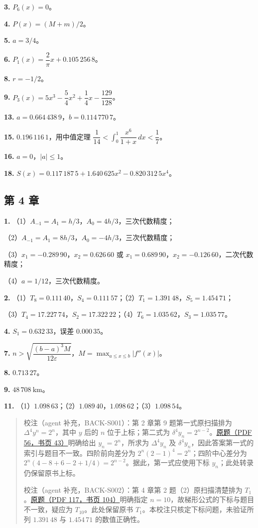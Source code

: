 \documentclass[
  10pt,
  fontset=fandol]{ctexart}
\begin{document}
\textbf{3.} \(P_6(x)=0\)。

\textbf{4.} \(P(x)=(M+m)/2\)。

\textbf{5.} \(a=3/4\)。

\textbf{6.} \(P_1(x)=\dfrac{2}{\pi}x+0.105\,256\,8\)。

\textbf{8.} \(r=-1/2\)。

\textbf{9.} \(P_3(x)=5x^3-\dfrac{5}{4}x^2+\dfrac{1}{4}x-\dfrac{129}{128}\)。

\textbf{13.} \(a=0.664\,438\,9\)，\(b=0.114\,770\,7\)。

\textbf{15.} \(0.196\,116\,1\)，用中值定理 \(\dfrac{1}{14}<\displaystyle\int_0^1\dfrac{x^6}{1+x}\,dx<\dfrac{1}{7}\)。

\textbf{16.} \(a=0\)，\(|a|\leqslant1\)。

\textbf{18.} \(S(x)=0.117\,187\,5+1.640\,625x^2-0.820\,312\,5x^4\)。

\subsection{第 4 章}\label{ux7b2c-4-ux7ae0}

\textbf{1.} （1）\(A_{-1}=A_1=h/3\)，\(A_0=4h/3\)，三次代数精度；

（2）\(A_{-1}=A_1=8h/3\)，\(A_0=-4h/3\)，三次代数精度；

（3）\(x_1=-0.289\,90\)，\(x_2=0.626\,60\) 或 \(x_1=0.689\,90\)，\(x_2=-0.126\,60\)，二次代数精度；

（4）\(a=1/12\)，三次代数精度。

\textbf{2.} （1）\(T_8=0.111\,40\)，\(S_4=0.111\,57\)；（2）\(T_1=1.391\,48\)，\(S_5=1.454\,71\)；

（3）\(T_4=17.227\,74\)，\(S_2=17.322\,22\)；（4）\(T_6=1.035\,62\)，\(S_3=1.035\,77\)。

\textbf{4.} \(S_1=0.632\,33\)，误差 \(0.000\,35\)。

\textbf{7.} \(n>\sqrt{\dfrac{(b-a)^3M}{12\varepsilon}}\)，\(M=\displaystyle\max_{a\leqslant x\leqslant b}|f''(x)|\)。

\textbf{8.} \(0.713\,27\)。

\textbf{9.} \(48\,708\ \mathrm{km}\)。

\textbf{11.} （1）\(1.098\,63\)；（2）\(1.089\,40\)，\(1.098\,62\)；（3）\(1.098\,54\)。

\begin{quote}
校注（agent 补充，BACK-S001）：第 2 章第 9 题第一式原扫描排为 \(\Delta^4y^n=2^n\)，其中 \(y\) 后的 \(n\) 位于上标；第二式为 \(\delta^4y_n=2^{n-2}\)。\href{../../source-images/pdf-056.jpeg}{原题（PDF 56，书页 43）}明确给出 \(y_n=2^n\)，所求为 \(\Delta^4y_n\) 及 \(\delta^4y_n\)，因此答案第一式的索引与题目不一致。四阶前向差分为 \(2^n(2-1)^4=2^n\)；四阶中心差分为 \(2^n(4-8+6-2+1/4)=2^{n-2}\)。据此，第一式应使用下标 \(y_n\)；此处转录仍保留原书上标。

校注（agent 补充，BACK-S002）：第 4 章第 2 题（2）原扫描清楚排为 \(T_1\)。\href{../../source-images/pdf-117.jpeg}{原题（PDF 117，书页 104）}明确指定 \(n=10\)，故梯形公式的下标与题目不一致，疑应为 \(T_{10}\)。此处保留原书 \(T_1\)。本校注只核定下标问题，未验证所列 \(1.391\,48\) 与 \(1.454\,71\) 的数值正确性。
\end{quote}
\end{document}
